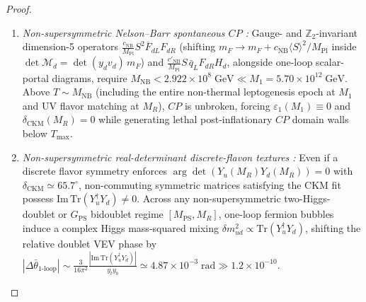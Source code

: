 \documentclass[11pt,a4paper]{article}
\begin{document}
\begin{proof}
\begin{enumerate}[label=(\roman*),leftmargin=1.9em,itemsep=2pt]
\begin{equation}
\begin{aligned}
v' &< \sqrt{\frac{1.2\times 10^{-10}\,y_u(M_R)}{|c_{u,11}|}}\,M_{\mathrm{Pl}} = 4.681\times 10^{10}\;\mathrm{GeV} \\
&\implies m_{u'}(M_R) = y_u(M_R)\,v' < 144.1\;\mathrm{TeV} \quad \big(m_{u'}(m_{u'}) \lesssim 228.0\;\mathrm{TeV} \ll T_{\mathrm{rh}} = 5.13\times 10^9\;\mathrm{GeV}\big),
\end{aligned}
\label{eq:mirror-nogo}
\end{equation}
after QCD running down to $\mu \simeq m_{u'}$. At $T = T_{\mathrm{rh}}$, QCD gluon scattering $\Gamma(gg \to u'\bar{u}') \sim \alpha_s^2 T_{\mathrm{rh}} \gg H(T_{\mathrm{rh}})$ thermally populates stable colored mirror quarks ($u'$ carries conserved mirror baryon/electric charge), violating Constraint \textbf{(C3)}.
\item \emph{Non-supersymmetric Nelson--Barr spontaneous $CP$ \cite{Nelson1984,Barr1984,BentoBrancoParada1991,DineKramerNir1997}:} Gauge- and $\mathbb{Z}_2$-invariant dimension-5 operators $\frac{c_{\mathrm{NB}}}{M_{\mathrm{Pl}}}S^2 \overline{F}_{dL} F_{dR}$ (shifting $m_F \to m_F + c_{\mathrm{NB}}\langle S\rangle^2/M_{\mathrm{Pl}}$ inside $\det\mathcal{M}_d = \det(y_d v_d)\,m_F$) and $\frac{c'_{\mathrm{NB}}}{M_{\mathrm{Pl}}}S\,\bar{q}_L F_{dR} H_d$, alongside one-loop scalar-portal diagrams, require $M_{\mathrm{NB}} < 2.922\times 10^8\;\mathrm{GeV} \ll M_1 = 5.70\times 10^{12}\;\mathrm{GeV}$. Above $T \sim M_{\mathrm{NB}}$ (including the entire non-thermal leptogenesis epoch at $M_1$ and UV flavor matching at $M_R$), $CP$ is unbroken, forcing $\varepsilon_1(M_1) \equiv 0$ and $\delta_{\mathrm{CKM}}(M_R) = 0$ while generating lethal post-inflationary $CP$ domain walls below $T_{\max}$.
\item \emph{Non-supersymmetric real-determinant discrete-flavon textures \cite{AntuschSpinrath2011}:} Even if a discrete flavor symmetry enforces $\arg\det(Y_u(M_R) Y_d(M_R)) = 0$ with $\delta_{\mathrm{CKM}} \simeq 65.7^\circ$, non-commuting symmetric matrices satisfying the CKM fit possess $\mathrm{Im}\,\mathrm{Tr}(Y_u^\dagger Y_d) \neq 0$. Across any non-supersymmetric two-Higgs-doublet or $G_{\mathrm{PS}}$ bidoublet regime $[M_{\mathrm{PS}}, M_R]$, one-loop fermion bubbles induce a complex Higgs mass-squared mixing $\delta m_{ud}^2 \propto \mathrm{Tr}(Y_u^\dagger Y_d)$, shifting the relative doublet VEV phase by $|\Delta\bar{\theta}_{\text{1-loop}}| \sim \frac{3}{16\pi^2}\frac{|\mathrm{Im}\,\mathrm{Tr}(Y_u^\dagger Y_d)|}{y_t y_b} \simeq 4.87\times 10^{-3}\;\mathrm{rad} \gg 1.2\times 10^{-10}$. \qedhere
\end{enumerate}
\end{proof}
\end{document}

